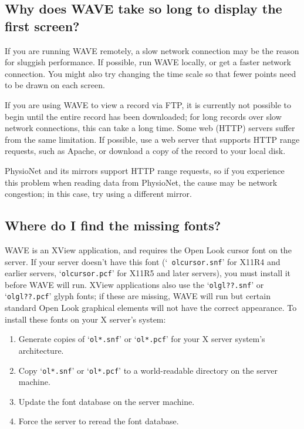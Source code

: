 \documentclass[twoside]{book}
\newcommand{\WAVE}{{\sf WAVE}\xspace}
\begin{document}
\subsection{Why does \WAVE{} take so long to display the first screen?}

If you are running \WAVE{} remotely, a slow network connection may be the
reason for sluggish performance.  If possible, run \WAVE{} locally, or get
a faster network connection.  You might also try changing the time scale
so that fewer points need to be drawn on each screen.

If you are using \WAVE{} to view a record via FTP, it is currently not possible
to begin until the entire record has been downloaded;  for long records over
slow network connections, this can take a long time.  Some web (HTTP) servers
suffer from the same limitation.  If possible, use a web server that supports
HTTP range requests, such as Apache, or download a copy of the record to your
local disk.

PhysioNet and its mirrors support HTTP range requests, so if you experience
this problem when reading data from PhysioNet, the cause may be network
congestion;  in this case, try using a different mirror.

\subsection{Where do I find the missing fonts?}

\label{faq:missing-fonts}
\WAVE{} is an XView
application, and requires the Open Look cursor font
on the server.  If your server doesn't have this font (`{\tt
olcursor.snf}' for X11R4 and earlier servers, `{\tt olcursor.pcf}' for
X11R5 and later servers), you must install it before \WAVE{} will run.
XView applications also use the `{\tt olgl??.snf}' or `{\tt olgl??.pcf}'
glyph fonts; if these are missing, \WAVE{} will run but certain standard
Open Look graphical elements will not have the correct appearance.  To
install these fonts on your X server's system:

\begin{enumerate}

\item
Generate copies of `{\tt ol*.snf}' or `{\tt ol*.pcf}' for your X server
system's architecture.

\item
Copy `{\tt ol*.snf}' or `{\tt ol*.pcf}' to a world-readable directory on the
server machine.

\item
Update the font database on the server machine.

\item
Force the server to reread the font database.
\end{enumerate}
\end{document}
